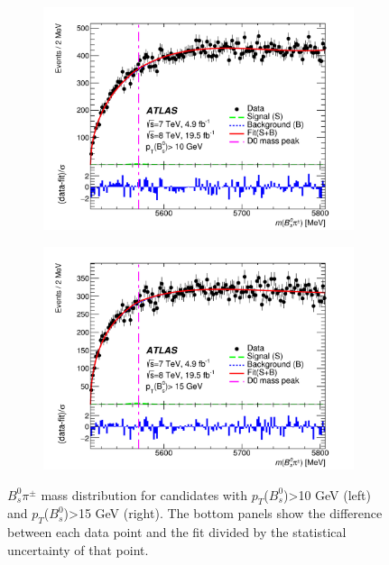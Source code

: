 \documentclass[epj]{webofc}
\begin{document}
\begin{figure}
    \centering
    \begin{subfigure}[H]{0.45\textwidth}
        \includegraphics[width=\textwidth]{plots/5568/fig_02a.png}
    \end{subfigure}
    \begin{subfigure}[H]{0.45\textwidth}
        \includegraphics[width=\textwidth]{plots/5568/fig_02b.png}
    \end{subfigure}
    \caption{$B_{s}^{0}\pi^{\pm}$ mass distribution for candidates with $p_T$($B_{s}^{0}$)>10 GeV (left) and $p_T$($B_{s}^{0}$)>15 GeV (right). 
     The bottom panels show the difference between each data point and the fit divided by the statistical uncertainty of that point.}
    \label{fig:5568}
\end{figure}
\end{document}
